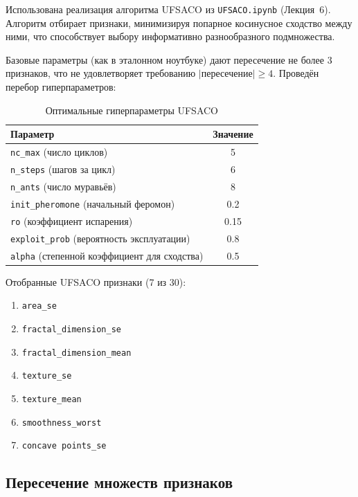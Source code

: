 Использована реализация алгоритма UFSACO из \texttt{UFSACO.ipynb} (Лекция~6). Алгоритм отбирает признаки, минимизируя попарное косинусное сходство между ними, что способствует выбору информативно разнообразного подмножества.

Базовые параметры (как в эталонном ноутбуке) дают пересечение не более 3 признаков, что не удовлетворяет требованию $|\text{пересечение}| \ge 4$. Проведён перебор гиперпараметров:

\begin{table}[H]
    \centering
    \caption{Оптимальные гиперпараметры UFSACO}
    \label{tab:aco_params}
    \begin{tabular}{|l|c|}
        \hline
        \textbf{Параметр} & \textbf{Значение} \\
        \hline
        \texttt{nc\_max} (число циклов) & 5 \\
        \texttt{n\_steps} (шагов за цикл) & 6 \\
        \texttt{n\_ants} (число муравьёв) & 8 \\
        \texttt{init\_pheromone} (начальный феромон) & 0.2 \\
        \texttt{ro} (коэффициент испарения) & 0.15 \\
        \texttt{exploit\_prob} (вероятность эксплуатации) & 0.8 \\
        \texttt{alpha} (степенной коэффициент для сходства) & 0.5 \\
        \hline
    \end{tabular}
\end{table}

Отобранные UFSACO признаки (7 из 30):
\begin{enumerate}
    \item \texttt{area\_se}
    \item \texttt{fractal\_dimension\_se}
    \item \texttt{fractal\_dimension\_mean}
    \item \texttt{texture\_se}
    \item \texttt{texture\_mean}
    \item \texttt{smoothness\_worst}
    \item \texttt{concave points\_se}
\end{enumerate}

\subsection{Пересечение множеств признаков}

